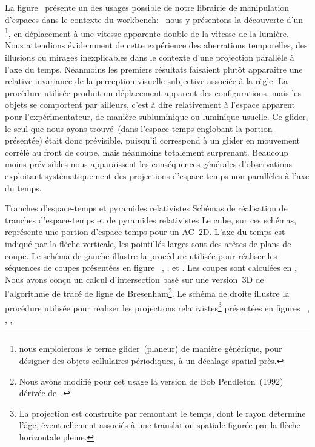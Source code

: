 \noindent La figure~ pr\'esente un des usages
possible de notre librairie de manipulation d'espaces dans le
contexte du workbench:~%
nous y pr\'esentons la d\'ecouverte d'un \footnote{%
  nous emploierons le terme glider~(planeur) de mani\`ere g\'en\'erique, \ie
  pour d\'esigner des objets cellulaires p\'eriodiques, \`a un d\'ecalage spatial pr\`es.}, %
en d\'eplacement \`a une vitesse apparente double de la
vitesse de la lumi\`ere. %
Nous attendions \'evidemment de cette exp\'erience des aberrations
temporelles, des illusions ou mirages inex\-plicables dans le contexte
d'une projection parall\`ele \`a l'axe du temps. %
N\'eanmoins les premiers r\'esultats faisaient plut\^ot appara\^itre une
relative invariance de la perception visuelle subjective associ\'ee \`a la
r\`egle. %
La proc\'edure utilis\'ee produit un d\'eplacement apparent des
configurations, mais les objets se comportent par ailleurs, c'est \`a
dire relativement \`a l'espace apparent pour l'exp\'erimentateur, de
mani\`ere subluminique ou luminique usuelle. %
Ce glider, le seul que nous ayons trouv\'e~(dans l'espace-temps
englobant la portion pr\'esent\'ee) \'etait donc pr\'evisible, puisqu'il
correspond \`a un glider en mouvement corr\'el\'e au front de coupe, mais
n\'eanmoins totalement surprenant. %
Beaucoup moins pr\'evisibles nous apparaissent les cons\'equences
g\'en\'erales d'observations exploitant syst\'ematiquement des projections
d'espace-temps non parall\`eles \`a l'axe du temps.

%
{Tranches d'espace-temps et pyramides relativistes}%
{Sch\'emas de r\'ealisation de tranches d'espace-temps et de pyramides relativistes}%
{Le cube, sur ces sch\'emas, repr\'esente une portion d'espace-temps pour
  un AC~2D. %
  L'axe du temps est indiqu\'e par la fl\`eche verticale, %
  les pointill\'es larges sont des ar\^etes de plans de coupe. %
  Le sch\'ema de gauche illustre la proc\'edure utilis\'ee pour r\'ealiser les
  s\'equences de coupes pr\'esent\'ees en figure~%
  , %
  , %
  et . %
  Les coupes sont calcul\'ees en , %
  Nous avons con\c{c}u un calcul d'intersection bas\'e sur une
  version~3D de l'algorithme de trac\'e de ligne de Bresenham\footnote{%
    Nous avons modifi\'e pour cet usage la version de Bob
    Pendleton~(1992) d\'eriv\'ee de~\cite{Heckbert90}.}. %
  Le sch\'ema de droite illustre la proc\'edure utilis\'ee pour r\'ealiser les
  projections relativistes\footnote{%
    La projection est construite par 
    remontant le temps, dont le rayon d\'etermine l'\^age, \'eventuellement
    associ\'es \`a une translation spatiale figur\'ee par la fl\`eche horizontale
    pleine.} %
  pr\'esent\'ees en figures~%
  , %
  , %
  , %
  }

